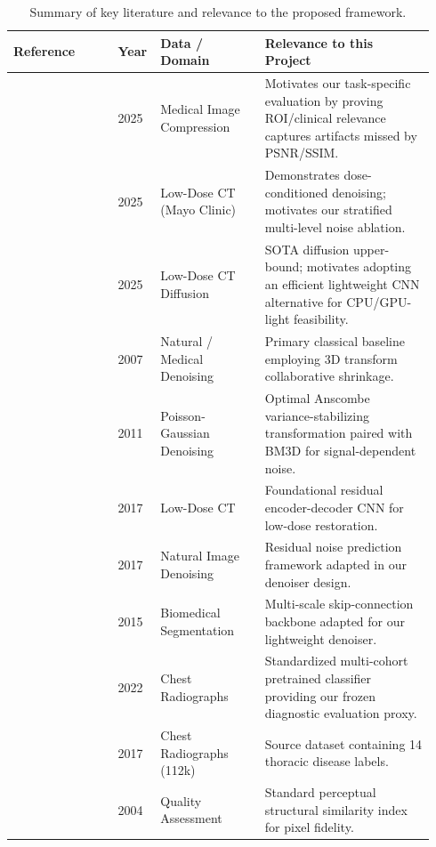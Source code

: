 \documentclass[11pt]{article}
\begin{document}
\begin{table}[t]
\centering
\small
\caption{Summary of key literature and relevance to the proposed framework.}
\label{tab:refs}
\begin{tabular}{@{}p{0.24\linewidth}p{0.07\linewidth}p{0.24\linewidth}p{0.39\linewidth}@{}}
\toprule
\textbf{Reference} & \textbf{Year} & \textbf{Data / Domain} & \textbf{Relevance to this Project} \\
\midrule
\citet{dai2025compression} & 2025 & Medical Image Compression & Motivates our task-specific evaluation by proving ROI/clinical relevance captures artifacts missed by PSNR/SSIM. \\
\citet{kim2025doseaware} & 2025 & Low-Dose CT (Mayo Clinic) & Demonstrates dose-conditioned denoising; motivates our stratified multi-level noise ablation. \\
\citet{zhao2025mocodiff} & 2025 & Low-Dose CT Diffusion & SOTA diffusion upper-bound; motivates adopting an efficient lightweight CNN alternative for CPU/GPU-light feasibility. \\
\citet{dabov2007bm3d} & 2007 & Natural / Medical Denoising & Primary classical baseline employing 3D transform collaborative shrinkage. \\
\citet{makitalo2011anscombe} & 2011 & Poisson-Gaussian Denoising & Optimal Anscombe variance-stabilizing transformation paired with BM3D for signal-dependent noise. \\
\citet{chen2017redcnn} & 2017 & Low-Dose CT & Foundational residual encoder-decoder CNN for low-dose restoration. \\
\citet{zhang2017dncnn} & 2017 & Natural Image Denoising & Residual noise prediction framework adapted in our denoiser design. \\
\citet{ronneberger2015unet} & 2015 & Biomedical Segmentation & Multi-scale skip-connection backbone adapted for our lightweight denoiser. \\
\citet{cohen2022torchxrayvision} & 2022 & Chest Radiographs & Standardized multi-cohort pretrained classifier providing our frozen diagnostic evaluation proxy. \\
\citet{wang2017chestxray8} & 2017 & Chest Radiographs (112k) & Source dataset containing 14 thoracic disease labels. \\
\citet{wang2004ssim} & 2004 & Quality Assessment & Standard perceptual structural similarity index for pixel fidelity. \\
\bottomrule
\end{tabular}
\end{table}
\end{document}
